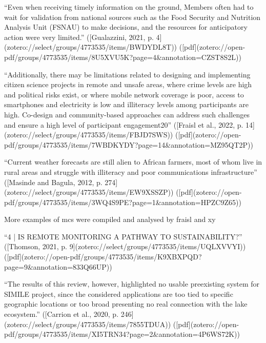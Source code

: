 “Even when receiving timely information on the ground, Members often had to wait for validation from national sources such as the Food Security and Nutrition Analysis Unit (FSNAU) to make decisions, and the resources for anticipatory action were very limited.” ([Gualazzini, 2021, p. 4](zotero://select/groups/4773535/items/BWDYDL8T)) ([pdf](zotero://open-pdf/groups/4773535/items/8U5XVU5K?page=4&annotation=CZST8S2L))


“Additionally, there may be limitations related to designing and implementing citizen science projects in remote and unsafe areas, where crime levels are high and political risks exist, or where mobile network coverage is poor, access to smartphones and electricity is low and illiteracy levels among participants are high. Co-design and community-based approaches can address such challenges and ensure a high level of participant engagement20” ([Fraisl et al., 2022, p. 14](zotero://select/groups/4773535/items/FBJD7SWS)) ([pdf](zotero://open-pdf/groups/4773535/items/7WBDKYDY?page=14&annotation=MZ95QT2P))

“Current weather forecasts are still alien to African farmers, most of whom live in rural areas and struggle with illiteracy and poor communications infrastructure” ([Masinde and Bagula, 2012, p. 274](zotero://select/groups/4773535/items/EW9XSSZP)) ([pdf](zotero://open-pdf/groups/4773535/items/3WQ4S9PE?page=1&annotation=HPZC9Z65))



More examples of \acrshort*{mcs} were compiled and analysed by fraisl and xy




“4 | IS REMOTE MONITORING A PATHWAY TO SUSTAINABILITY?” ([Thomson, 2021, p. 9](zotero://select/groups/4773535/items/UQLXVVYI)) ([pdf](zotero://open-pdf/groups/4773535/items/K9XBXPQD?page=9&annotation=833Q66UP))

“The results of this review, however, highlighted no usable preexisting system for SIMILE project, since the considered applications are too tied to specific geographic locations or too broad presenting no real connection with the lake ecosystem.” ([Carrion et al., 2020, p. 246](zotero://select/groups/4773535/items/7855TDUA)) ([pdf](zotero://open-pdf/groups/4773535/items/XI5TRN34?page=2&annotation=4P6WS72K))

